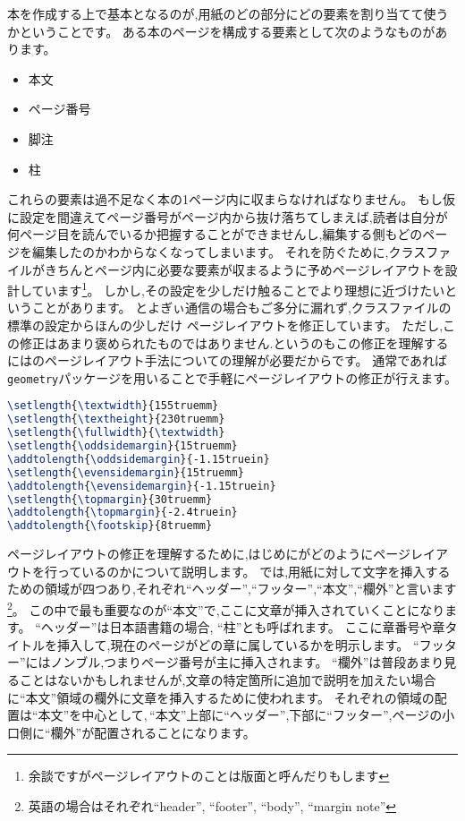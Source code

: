 本を作成する上で基本となるのが,用紙のどの部分にどの要素を割り当てて使うかということです。
ある本のページを構成する要素として次のようなものがあります。
\begin{itemize}
	\item 本文
	\item ページ番号
	\item 脚注
	\item 柱
\end{itemize}
これらの要素は過不足なく本の1ページ内に収まらなければなりません。
もし仮に設定を間違えてページ番号がページ内から抜け落ちてしまえば,読者は自分が何ページ目を読んでいるか把握することができませんし,編集する側もどのページを編集したのかわからなくなってしまいます。
それを防ぐために,クラスファイルがきちんとページ内に必要な要素が収まるように予めページレイアウトを設計しています\footnote{余談ですがページレイアウトのことは版面と呼んだりもします}。
しかし,その設定を少しだけ触ることでより理想に近づけたいということがあります。
とよぎぃ通信の場合もご多分に漏れず,クラスファイルの標準の設定からほんの少しだけ
ページレイアウトを修正しています。
ただし,この修正はあまり褒められたものではありません.というのもこの修正を理解するには{\pLaTeX}のページレイアウト手法についての理解が必要だからです。
通常であれば\verb|geometry|パッケージを用いることで手軽にページレイアウトの修正が行えます。
\begin{lstlisting}[caption = ページレイアウトの修正,label = list:layout,language = tex]
\setlength{\textwidth}{155truemm}
\setlength{\textheight}{230truemm}
\setlength{\fullwidth}{\textwidth}
\setlength{\oddsidemargin}{15truemm}
\addtolength{\oddsidemargin}{-1.15truein}
\setlength{\evensidemargin}{15truemm}
\addtolength{\evensidemargin}{-1.15truein}
\setlength{\topmargin}{30truemm}
\addtolength{\topmargin}{-2.4truein}
\addtolength{\footskip}{8truemm}
\end{lstlisting}

ページレイアウトの修正を理解するために,はじめに{\pLaTeX}がどのようにページレイアウトを行っているのかについて説明します。
{\pLaTeX}では,用紙に対して文字を挿入するための領域が四つあり,それぞれ``ヘッダー'',``フッター'',``本文'',``欄外''と言います
\footnote{英語の場合はそれぞれ``header'', ``footer'', ``body'', ``margin note''}。
この中で最も重要なのが``本文''で,ここに文章が挿入されていくことになります。
``ヘッダー''は日本語書籍の場合, ``柱''とも呼ばれます。
ここに章番号や章タイトルを挿入して,現在のページがどの章に属しているかを明示します。
``フッター''にはノンブル,つまりページ番号が主に挿入されます。
``欄外''は普段あまり見ることはないかもしれませんが,文章の特定箇所に追加で説明を加えたい場合に``本文''領域の欄外に文章を挿入するために使われます。
それぞれの領域の配置は``本文''を中心として,\,``本文''上部に``ヘッダー'',下部に``フッター'',ページの小口側に``欄外''が配置されることになります。

